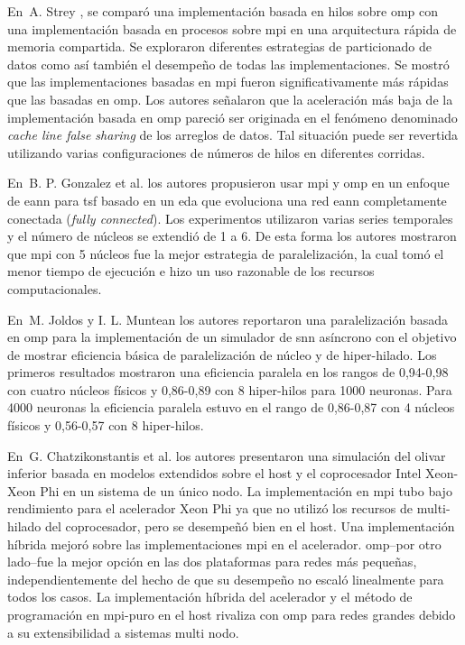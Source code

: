 {En~A. Strey \cite{Strey2003ACO}, se comparó una implementación basada en hilos sobre \gls{omp} con una implementación basada en procesos sobre \gls{mpi} en una arquitectura rápida de memoria compartida.
Se exploraron diferentes estrategias de particionado de datos como así también el desempeño de todas las implementaciones.
Se mostró que las implementaciones basadas en \gls{mpi} fueron significativamente más rápidas que las basadas en \gls{omp}.
Los autores señalaron que la aceleración más baja de la implementación basada en \gls{omp} pareció ser originada en el fenómeno denominado \emph{cache line false sharing} de los arreglos de datos. Tal situación puede ser revertida utilizando varias configuraciones de números de hilos en diferentes corridas.

En~B. P. Gonzalez et al. \cite{6232827} los autores propusieron usar \gls{mpi} y \gls{omp} en un enfoque de \gls{eann} para \gls{tsf} basado en un \gls{eda} que evoluciona una red \gls{eann} completamente conectada (\emph{fully connected}).
Los experimentos utilizaron varias series temporales y el número de núcleos se extendió de 1 a 6.
De esta forma los autores mostraron que \gls{mpi} con 5 núcleos fue la mejor estrategia de paralelización, la cual tomó el menor tiempo de ejecución e hizo un uso razonable de los recursos computacionales.

En~M. Joldos y I. L. Muntean \cite{6511739} los autores reportaron una paralelización basada en \gls{omp} para la implementación de un simulador de \gls{snn} asíncrono con el objetivo de mostrar eficiencia básica de paralelización de núcleo y de hiper-hilado.
Los primeros resultados mostraron una eficiencia paralela en los rangos de 0,94-0,98 con cuatro núcleos físicos y 0,86-0,89 con 8 hiper-hilos para 1000 neuronas.
Para 4000 neuronas la eficiencia paralela estuvo en el rango de 0,86-0,87 con 4 núcleos físicos y 0,56-0,57 con 8 hiper-hilos.

En~G. Chatzikonstantis et al. \cite{Chatzikonstantis:2016:FID:2903150.2903477} los autores presentaron una simulación del olivar inferior basada en modelos  extendidos sobre el host y el coprocesador Intel Xeon-Xeon Phi en un sistema de un único nodo.
La implementación en \gls{mpi} tubo bajo rendimiento para el acelerador Xeon Phi ya que no utilizó los recursos de multi-hilado del coprocesador, pero se desempeñó bien en el host. 
Una implementación híbrida mejoró sobre las implementaciones \gls{mpi} en el acelerador.
\gls{omp}--por otro lado--fue la mejor opción en las dos plataformas para redes más pequeñas, independientemente del hecho de que su desempeño no escaló linealmente para todos los casos.
La implementación híbrida del acelerador y el método de programación en \gls{mpi}-puro en el host rivaliza con \gls{omp} para redes grandes debido a su extensibilidad a sistemas multi nodo.
}{
}
